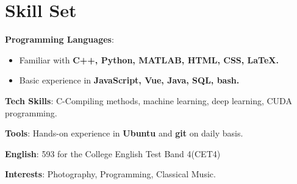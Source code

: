 \documentclass{chicv}
\begin{document}
\section{Skill Set}
\begin{compactlist}
  \item \textbf{Programming Languages}: 
  \begin{itemize}
    \item Familiar with \textbf{C++, Python, MATLAB, HTML, CSS, \LaTeX.}
    \item Basic experience in \textbf{JavaScript, Vue, Java, SQL, bash.}
  \end{itemize}
  \item \textbf{Tech Skills}: C-Compiling methods, machine learning, deep learning, CUDA programming.
  \item \textbf{Tools}: Hands-on experience in \textbf{Ubuntu} and \textbf{git} on daily basis.
  \item \textbf{English}: 593 for the College English Test Band 4(CET4)
  \item \textbf{Interests}: Photography, Programming, Classical Music.
\end{compactlist}
\end{document}
